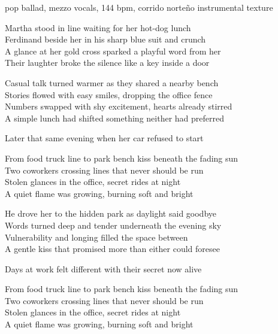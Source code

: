 

\begin{notes}
\end{notes}

\begin{style}
pop ballad, mezzo vocals, 144 bpm, corrido norteño instrumental texture
\end{style}

\begin{lyrics}

Martha stood in line waiting for her hot-dog lunch\\
Ferdinand beside her in his sharp blue suit and crunch\\
A glance at her gold cross sparked a playful word from her\\
Their laughter broke the silence like a key inside a door

Casual talk turned warmer as they shared a nearby bench\\
Stories flowed with easy smiles, dropping the office fence\\
Numbers swapped with shy excitement, hearts already stirred\\
A simple lunch had shifted something neither had preferred

Later that same evening when her car refused to start

From food truck line to park bench kiss beneath the fading sun\\
Two coworkers crossing lines that never should be run\\
Stolen glances in the office, secret rides at night\\
A quiet flame was growing, burning soft and bright

He drove her to the hidden park as daylight said goodbye\\
Words turned deep and tender underneath the evening sky\\
Vulnerability and longing filled the space between\\
A gentle kiss that promised more than either could foresee

Days at work felt different with their secret now alive

From food truck line to park bench kiss beneath the fading sun\\
Two coworkers crossing lines that never should be run\\
Stolen glances in the office, secret rides at night\\
A quiet flame was growing, burning soft and bright


\end{lyrics}
